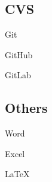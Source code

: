 \documentclass[]{deedy-resume-openfont}
\begin{document}
\begin{minipage}[t]{0.5\textwidth}
\vspace{\topsep}
\begin{minipage}[t]{0.45\textwidth}
    \subsection{CVS}
    \vspace{\topsep}
    \begin{tightemize}
        \item Git
        \item GitHub
        \item GitLab
    \end{tightemize}
\end{minipage}
\hfill
\begin{minipage}[t]{0.45\textwidth}
    \subsection{Others}
    \vspace{\topsep}
    \begin{tightemize}
        \item Word
        \item Excel
        \item LaTeX\
    \end{tightemize}
\end{minipage}




%




\end{minipage}
\end{document}
